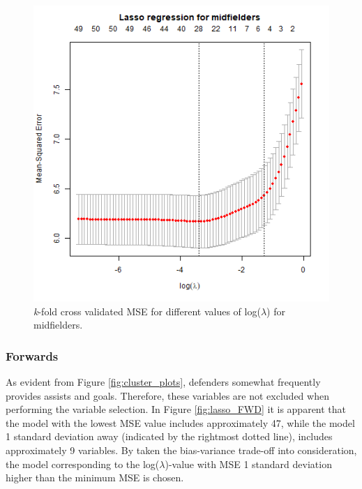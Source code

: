 \begin{figure}[H]
    \centering
    \includegraphics[scale=0.55]{fig/chapter_6/lasso_MID.png}
    \caption{\textit{k}-fold cross validated MSE for different values of log($\lambda$) for midfielders.}
\label{fig:lasso_MID}    
\end{figure}

\subsubsection{Forwards}
As evident from Figure \ref{fig:cluster_plots}, defenders somewhat frequently provides assists and goals. Therefore, these variables are not excluded when performing the variable selection. In Figure \ref{fig:lasso_FWD} it is apparent that the model with the lowest MSE value includes approximately 47, while the model 1 standard deviation away (indicated by the rightmost dotted line), includes approximately 9 variables. By taken the bias-variance trade-off into consideration, the model corresponding to the log($\lambda$)-value with MSE 1 standard deviation higher than the minimum MSE is chosen.

